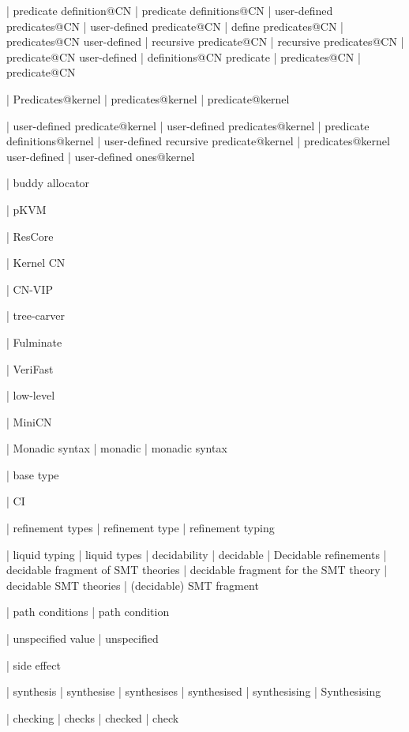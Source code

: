  | predicate definition@CN
 | predicate definitions@CN
 | user-defined predicates@CN
 | user-defined predicate@CN
 | define predicates@CN
 | predicates@CN user-defined
 | recursive predicate@CN
 | recursive predicates@CN
 | predicate@CN user-defined
 | definitions@CN predicate
 | predicates@CN
 | predicate@CN

 | Predicates@kernel
 | predicates@kernel
 | predicate@kernel

 | user-defined predicate@kernel
 | user-defined predicates@kernel
 | predicate definitions@kernel
 | user-defined recursive predicate@kernel
 | predicates@kernel user-defined
 | user-defined ones@kernel

 | buddy allocator

 | pKVM

 | ResCore

 | Kernel CN

 | CN-VIP

 | tree-carver

 | Fulminate

 | VeriFast

 | low-level

 | MiniCN

 | Monadic syntax
 | monadic
 | monadic syntax

 | base type

 | CI

 | refinement types
 | refinement type
 | refinement typing

 | liquid typing
 | liquid types
 | decidability
 | decidable
 | Decidable refinements
 | decidable fragment of SMT theories
 | decidable fragment for the SMT theory
 | decidable SMT theories
 | (decidable) SMT fragment

 | path conditions
 | path condition

 | unspecified value
 | unspecified

 | side effect

 | synthesis
 | synthesise
 | synthesises
 | synthesised
 | synthesising
 | Synthesising

 | checking
 | checks
 | checked
 | check

